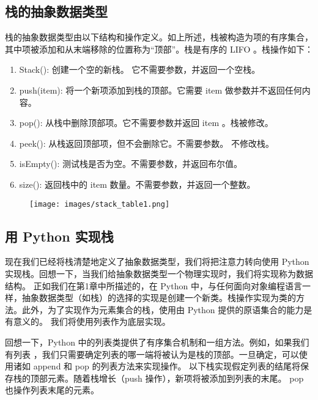 \documentclass[9pt]{beamer}
\begin{document}
\subsection{栈的抽象数据类型}
\begin{frame}\ft{\subsecname}
栈的抽象数据类型由以下结构和操作定义。如上所述，栈被构造为项的有序集合，其中项被添加和从末端移除的位置称为“顶部”。栈是有序的 LIFO 。栈操作如下：
\begin{enumerate}
        \item { Stack()}: 创建一个空的新栈。 它不需要参数，并返回一个空栈。
        \item { push(item)}: 将一个新项添加到栈的顶部。它需要 item 做参数并不返回任何内容。
        \item { pop()}: 从栈中删除顶部项。它不需要参数并返回 item 。栈被修改。
        \item { peek()}: 从栈返回顶部项，但不会删除它。不需要参数。 不修改栈。
        \item { isEmpty()}: 测试栈是否为空。不需要参数，并返回布尔值。
        \item { size()}: 返回栈中的 item 数量。不需要参数，并返回一个整数。 
\end{enumerate}
\end{frame}
 
\begin{frame}\ft{\subsecname}
\begin{figure}[htbp]
        \centering
        \texttt{[image: images/stack\_table1.png]}
\end{figure}
\end{frame}


\subsection{用 Python 实现栈}

\begin{frame}\ft{\subsecname}
现在我们已经将栈清楚地定义了抽象数据类型，我们将把注意力转向使用 Python 实现栈。回想一下，当我们给抽象数据类型一个物理实现时，我们将实现称为数据结构。
正如我们在第1章中所描述的，在 Python 中，与任何面向对象编程语言一样，抽象数据类型（如栈）的选择的实现是创建一个新类。栈操作实现为类的方法。此外，为了实现作为元素集合的栈，使用由 Python 提供的原语集合的能力是有意义的。 我们将使用列表作为底层实现。
\end{frame}


\begin{frame}\ft{\subsecname}
回想一下，Python 中的列表类提供了有序集合机制和一组方法。例如，如果我们有列表 {\tf [2, 5, 3, 6, 7, 4]}，我们只需要确定列表的哪一端将被认为是栈的顶部。一旦确定，可以使用诸如 {\tf append} 和 {\tf pop} 的列表方法来实现操作。
以下栈实现假定列表的结尾将保存栈的顶部元素。随着栈增长（{\tf push} 操作），新项将被添加到列表的末尾。 {\tf pop} 也操作列表末尾的元素。
\end{frame}
\end{document}
